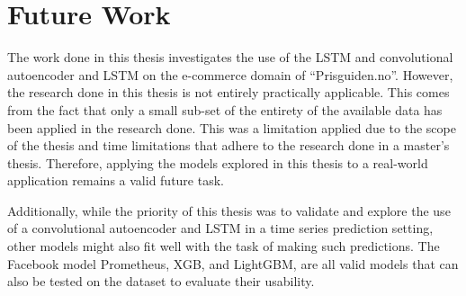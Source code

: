
\section{Future Work}
\label{sections:Discussion:FutureWork}


The work done in this thesis investigates the use of the LSTM and convolutional autoencoder and LSTM
on the e-commerce domain of ``Prisguiden.no''.
However, the research done in this thesis is not entirely practically applicable.
This comes from the fact that only a small sub-set of the entirety of the available data has been applied
in the research done.
This was a limitation applied due to the scope of the thesis and time limitations that adhere to the research done in a master's thesis.
Therefore, applying the models explored in this thesis to a real-world application remains a valid future task.

Additionally, while the priority of this thesis was to validate and explore the use of a convolutional autoencoder and LSTM
in a time series prediction setting, other models might also fit well with the task of making such predictions.
The Facebook model Prometheus, XGB, and LightGBM,
are all valid models that can also be tested on the dataset to evaluate their usability.




